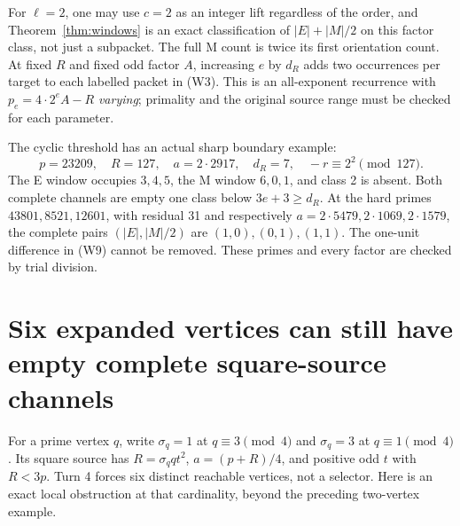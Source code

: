 For $\ell=2$, one may use $c=2$ as an integer lift regardless of the order,
and Theorem~\ref{thm:windows} is an exact classification of $|E|+|M|/2$ on
this factor class, not just a subpacket. The full M count is twice its first
orientation count. At fixed $R$ and fixed odd factor $A$, increasing $e$ by
$d_R$ adds two occurrences per target to each labelled packet in (W3). This is
an all-exponent recurrence with $p_e=4\cdot2^e A-R$ \emph{varying}; primality
and the original source range must be checked for each parameter.

The cyclic threshold has an actual sharp boundary example:
\[
 p=23209,\quad R=127,\quad a=2\cdot2917,\quad
 d_R=7,\quad-r\equiv2^2\pmod{127}.
\]
The E window occupies $3,4,5$, the M window $6,0,1$, and class 2 is absent.
Both complete channels are empty one class below $3e+3\ge d_R$.
At the hard primes $43801,8521,12601$, with residual 31 and respectively
$a=2\cdot5479,2\cdot1069,2\cdot1579$, the complete pairs
$(|E|,|M|/2)$ are $(1,0),(0,1),(1,1)$. The one-unit difference in (W9)
cannot be removed. These primes and every factor are checked by trial division.

\section{Six expanded vertices can still have empty complete square-source channels}
For a prime vertex $q$, write $\sigma_q=1$ at $q\equiv3\pmod4$ and
$\sigma_q=3$ at $q\equiv1\pmod4$. Its square source has
$R=\sigma_q qt^2$, $a=(p+R)/4$, and positive odd $t$ with $R<3p$.
Turn 4 forces six distinct reachable vertices, not a selector. Here is an exact
local obstruction at that cardinality, beyond the preceding two-vertex example.

